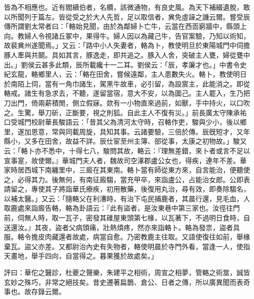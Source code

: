 \begin{pinyinscope}
皆為不相應也。近有閻續伯者，名纘，該微通物，有良史風。為天下補綴遺脫，敢以所聞列于篇左。皆從受之於大人先哲，足以取信者，兾免虛誣之譏云爾。嘗受辰傳所謂劉太常者曰：「輅始見聞，由於為鄰婦卜亡牛，云當在西靣窮牆中，縣頭上向。教婦人令視諸丘冢中，果得牛。婦人因以為藏己牛，告官案驗，乃知以術知，故裴兾州遂聞焉。」又云：「路中小人失妻者，輅為卜，教使明旦於東陽城門中伺擔豚人牽與共鬬。具如其言，豚逸走，即共追之。豚入人舍，突破主人甕，婦從甕中出。」劉侯云甚多此類，辰所載纔十一二耳。劉侯云：「辰，孝廉才也。」中書令史紀玄龍，輅鄉里人，云：「輅在田舍，嘗候遠鄰，主人患數失火。輅卜，教使明日於南陌上伺，當有一角巾諸生，駕黑牛故車，必引留，為設賔主，此能消之。即從輅戒。諸生有急求去，不聽，遂留當宿，意大不安，以為圖己。主人罷入，生乃把刀出門，倚兩薪積閒，側立假寐。欻有一小物直來過前，如獸，手中持火，以口吹之。生驚，舉刀斫，正斷要，視之則狐。自此主人不復有災。」前長廣太守陳承祐口受城門校尉華長駿語云：「昔其父為清河太守時，召輅作吏，駿與少小，後以鄉里，遂加恩意，常與同載周旋，具知其事。云諸要驗，三倍於傳。辰旣短才，又年縣小，又多在田舍，故益不詳。辰仕宦至州主簿、部從事，太康之初物故。」駿又云：「輅卜亦不悉中，十得七八，駿問其故，輅云：『理無差錯，來卜者或言不足以宣事寔，故使爾。』華城門夫人者，魏故司空涿郡盧公女也，得疾，連年不差。華家時居西城下南纏里中，三廄在其東南。輅卜當有師從東方來，自言能治，便聽使之，必得其力。後無何，有南征廄騶，當充甲卒，來詣盧公，占能治女郎。公即表請留之，專使其子將詣華氏療疾，初用散藥，後復用丸治，尋有效，即奏除騶名，以補太醫。」又云：「隨輅父在利漕時，有治下屯民捕鹿者，其晨行還，見毛血，人取鹿處來詣廄告輅，輅為卦語云：『此有盜者，是汝東巷中第三家也。汝徑往門前，伺無人時，取一瓦子，密發其碓屋東頭第七椽，以瓦著下，不過明日食時，自送還汝。』其夜，盜者父病頭痛，壯熱煩疼，然亦來詣輅卜。輅為發祟，盜者具服。輅令擔皮肉藏還者故處，病當自愈。乃密教鹿主往取。又語使復往如前，舉椽棄瓦。盜父亦差。又都尉治內史有失物者，輅使明晨於寺門外看，當逢一人，使指天畫地，舉手四向，自當得之。暮果獲於故處矣。」

評曰：華佗之醫診，杜夔之聲樂，朱建平之相術，周宣之相夢，管輅之術筮，誠皆玄妙之殊巧，非常之絕技矣。昔史遷著扁鵲、倉公、日者之傳，所以廣異聞而表奇事也。故存錄云爾。


\end{pinyinscope}